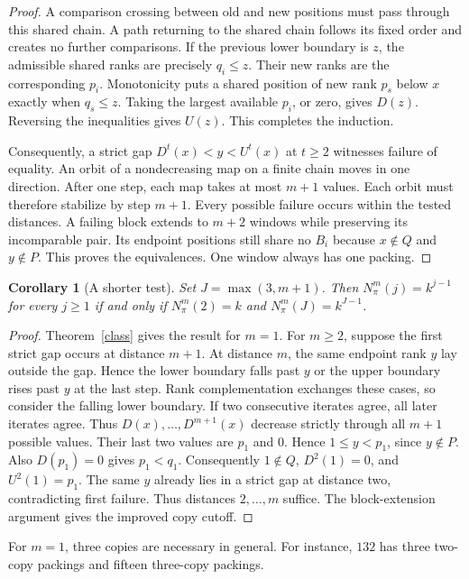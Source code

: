 \documentclass[11pt]{article}
\newtheorem{corollary}[theorem]{Corollary}
\newcommand{\N}{N_\pi^m}
\begin{document}
\begin{proof}
A comparison crossing between old and new positions must pass through this shared chain.
A path returning to the shared chain follows its fixed order and creates no further comparisons.
If the previous lower boundary is $z$, the admissible shared ranks are precisely $q_i\le z$.
Their new ranks are the corresponding $p_i$.
Monotonicity puts a shared position of new rank $p_s$ below $x$ exactly when $q_s\le z$.
Taking the largest available $p_i$, or zero, gives $D(z)$.
Reversing the inequalities gives $U(z)$. This completes the induction.

Consequently, a strict gap $D^t(x)<y<U^t(x)$ at $t\ge2$ witnesses failure of equality.
An orbit of a nondecreasing map on a finite chain moves in one direction.
After one step, each map takes at most $m+1$ values.
Each orbit must therefore stabilize by step $m+1$.
Every possible failure occurs within the tested distances.
A failing block extends to $m+2$ windows while preserving its incomparable pair.
Its endpoint positions still share no $B_i$ because $x\notin Q$ and $y\notin P$.
This proves the equivalences. One window always has one packing.
\end{proof}

\begin{corollary}[A shorter test]\label{short}
Set $J=\max(3,m+1)$. Then $\N(j)=k^{j-1}$ for every $j\ge1$ if and only if
$\N(2)=k$ and $\N(J)=k^{J-1}$.
\end{corollary}
\begin{proof}
Theorem~\ref{class} gives the result for $m=1$.
For $m\ge2$, suppose the first strict gap occurs at distance $m+1$.
At distance $m$, the same endpoint rank $y$ lay outside the gap.
Hence the lower boundary falls past $y$ or the upper boundary rises past $y$ at the last step.
Rank complementation exchanges these cases, so consider the falling lower boundary.
If two consecutive iterates agree, all later iterates agree.
Thus $D(x),\ldots,D^{m+1}(x)$ decrease strictly through all $m+1$ possible values.
Their last two values are $p_1$ and $0$. Hence $1\le y<p_1$, since $y\notin P$.
Also $D(p_1)=0$ gives $p_1<q_1$. Consequently $1\notin Q$, $D^2(1)=0$, and $U^2(1)=p_1$.
The same $y$ already lies in a strict gap at distance two, contradicting first failure.
Thus distances $2,\ldots,m$ suffice. The block-extension argument gives the improved copy cutoff.
\end{proof}
For $m=1$, three copies are necessary in general.
For instance, $132$ has three two-copy packings and fifteen three-copy packings.
\end{document}
